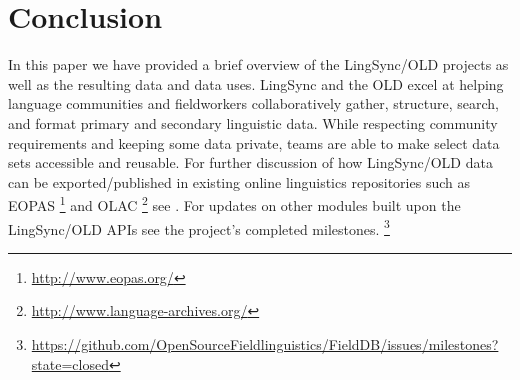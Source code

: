 \documentclass[11pt]{article}
\begin{document}
\section{Conclusion}

In this paper we have provided a brief overview of the LingSync/OLD projects as
well as the resulting data and data uses. LingSync and the OLD excel at helping
language communities and fieldworkers collaboratively gather, structure,
search, and format primary and secondary linguistic data. While respecting
community requirements and keeping some data private, teams are able to make
select data sets accessible and reusable. For further discussion of how
LingSync/OLD data can be exported/published in existing online linguistics
repositories such as EOPAS%
\footnote{\url{http://www.eopas.org/}} %
and OLAC%
\footnote{\url{http://www.language-archives.org/}} %
see \cite{lingsync:2012}. For updates on other modules built upon the
LingSync/OLD APIs see the project's completed milestones.%
\footnote{\url{https://github.com/OpenSourceFieldlinguistics/FieldDB/issues/milestones?state=closed}}






\end{document}
